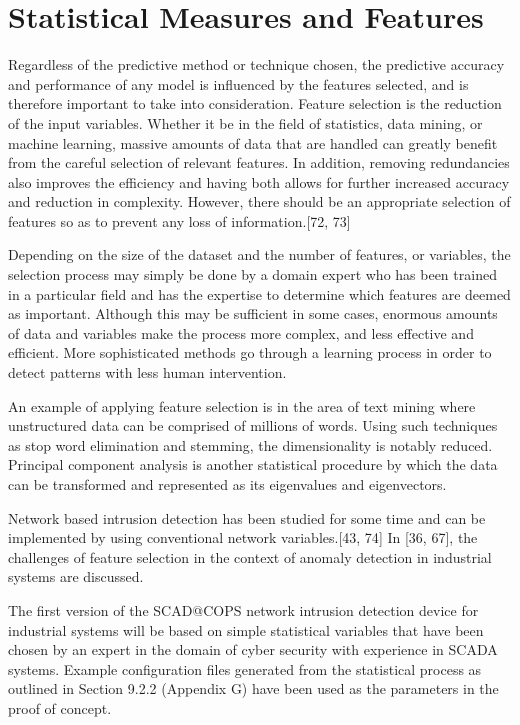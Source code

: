 \documentclass[11pt,a4paper]{article}
\begin{document}
\section{Statistical Measures and
Features}\label{statistical-measures-and-features}

Regardless of the predictive method or technique chosen, the predictive
accuracy and performance of any model is influenced by the features
selected, and is therefore important to take into consideration. Feature
selection is the reduction of the input variables. Whether it be in the
field of statistics, data mining, or machine learning, massive amounts
of data that are handled can greatly benefit from the careful selection
of relevant features. In addition, removing redundancies also improves
the efficiency and having both allows for further increased accuracy and
reduction in complexity. However, there should be an appropriate
selection of features so as to prevent any loss of information.{[}72,
73{]}

Depending on the size of the dataset and the number of features, or
variables, the selection process may simply be done by a domain expert
who has been trained in a particular field and has the expertise to
determine which features are deemed as important. Although this may be
sufficient in some cases, enormous amounts of data and variables make
the process more complex, and less effective and efficient. More
sophisticated methods go through a learning process in order to detect
patterns with less human intervention.

An example of applying feature selection is in the area of text mining
where unstructured data can be comprised of millions of words. Using
such techniques as stop word elimination and stemming, the
dimensionality is notably reduced. Principal component analysis is
another statistical procedure by which the data can be transformed and
represented as its eigenvalues and eigenvectors.

Network based intrusion detection has been studied for some time and can
be implemented by using conventional network variables.{[}43, 74{]} In
{[}36, 67{]}, the challenges of feature selection in the context of
anomaly detection in industrial systems are discussed.

The first version of the SCAD@COPS network intrusion detection device
for industrial systems will be based on simple statistical variables
that have been chosen by an expert in the domain of cyber security with
experience in SCADA systems. Example configuration files generated from
the statistical process as outlined in Section 9.2.2 (Appendix G) have
been used as the parameters in the proof of concept.
\end{document}
